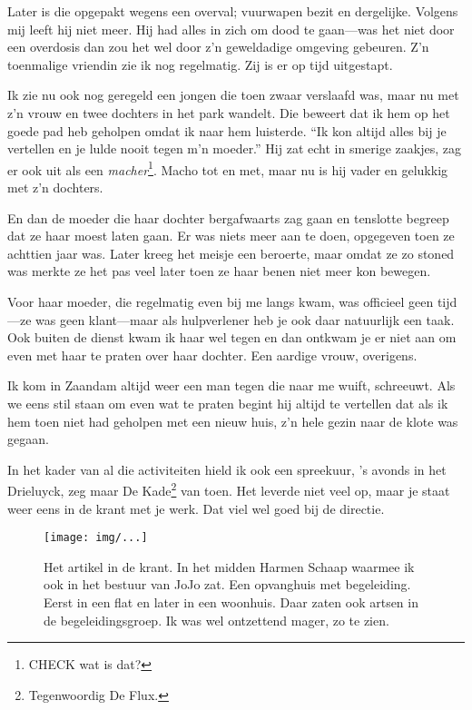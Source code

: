 \documentclass[10pt,twoside,openright]{memoir}
\begin{document}
Later is die opgepakt wegens een overval; vuurwapen bezit en dergelijke. Volgens mij leeft hij niet meer. Hij had alles in zich om dood te gaan---was het niet door een overdosis dan zou het wel door z’n geweldadige omgeving gebeuren. Z’n toenmalige vriendin zie ik nog regelmatig. Zij is er op tijd uitgestapt.

Ik zie nu ook nog geregeld een jongen die toen zwaar verslaafd was, maar nu met z’n vrouw en twee dochters in het park wandelt. Die beweert dat ik hem op het goede pad heb geholpen omdat ik naar hem luisterde. ``Ik kon altijd alles bij je vertellen en je lulde nooit tegen m’n moeder.'' Hij zat echt in smerige zaakjes, zag er ook uit als een \emph{macher}\footnote{CHECK wat is dat?}. Macho tot en met, maar nu is hij vader en gelukkig met z’n dochters. 

En dan de moeder die haar dochter bergafwaarts zag gaan en tenslotte begreep dat ze haar moest laten gaan. Er was niets meer aan te doen, opgegeven toen ze achttien jaar was. Later kreeg het meisje een beroerte, maar omdat ze zo stoned was merkte ze het pas veel later toen ze haar benen niet meer kon bewegen. 

Voor haar moeder, die regelmatig even bij me langs kwam, was officieel geen tijd---ze was geen klant---maar als hulpverlener heb je ook daar natuurlijk een taak. Ook buiten de dienst kwam ik haar wel tegen en dan ontkwam je er niet aan om even met haar te praten over haar dochter. Een aardige vrouw, overigens.

Ik kom in Zaandam altijd weer een man tegen die naar me wuift, schreeuwt. Als we eens stil staan om even wat te praten begint hij altijd te vertellen dat als ik hem toen niet had geholpen met een nieuw huis, z’n hele gezin naar de klote was gegaan.

In het kader van al die activiteiten hield ik ook een spreekuur, 's avonds in het Drieluyck, zeg maar De Kade\footnote{Tegenwoordig De Flux.} van toen. Het leverde niet veel op, maar je staat weer eens in de krant met je werk. Dat viel wel goed bij de directie. 

\begin{figure}[t]
\texttt{[image: img/...]}
\caption{Het artikel in de krant. In het midden Harmen Schaap waarmee ik ook in het bestuur van JoJo zat. Een opvanghuis met begeleiding. Eerst in een flat en later in een woonhuis. Daar zaten ook artsen in de begeleidingsgroep. Ik was wel ontzettend mager, zo te zien.}
\end{figure}
\end{document}
